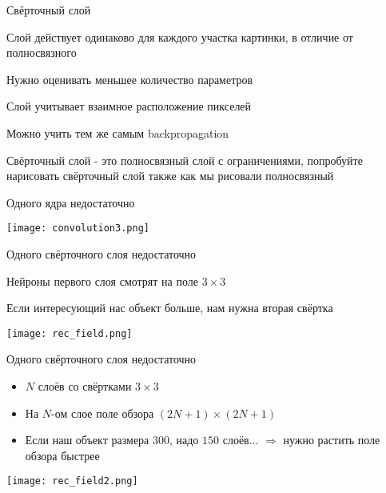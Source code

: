 \documentclass[notes,12pt, aspectratio=169]{beamer}
\newenvironment{wideitemize}{\itemize\addtolength{\itemsep}{10pt}}{\enditemize}
\begin{document}
\begin{frame}{Свёрточный слой}
\begin{wideitemize}
	\item  Слой действует одинаково для каждого участка картинки, в отличие от полносвязного 
	\item  Нужно оценивать меньшее количество параметров
	\item  Слой учитывает взаимное расположение пикселей
	\item  Можно учить тем же самым backpropagation 
	\item  Свёрточный слой -  это полносвязный слой с ограничениями, \alert{попробуйте нарисовать свёрточный слой также как мы рисовали полносвязный} 
\end{wideitemize}
\end{frame}


\begin{frame}{Одного ядра недостаточно}
\begin{center}
	\texttt{[image: convolution3.png]}
\end{center}
\end{frame}


\begin{frame}{Одного свёрточного слоя недостаточно}
\begin{wideitemize}
	\item  Нейроны первого слоя смотрят на поле $3 \times 3$ 
	\item  Если интересующий нас объект больше, нам нужна вторая свёртка 
\end{wideitemize}

\begin{center}
	\texttt{[image: rec\_field.png]}
\end{center}
\end{frame}


\begin{frame}{Одного свёрточного слоя недостаточно}
\begin{itemize}
	\item  $N$ слоёв со свёртками $3 \times 3$ 
	\item  На $N$-ом слое поле обзора  $(2N + 1) \times (2N + 1)$
	\item  Если наш объект размера $300$, надо $150$ слоёв...  \alert{$\Rightarrow$ нужно растить поле обзора быстрее}
\end{itemize}

\begin{center}
	\texttt{[image: rec\_field2.png]}
\end{center}
\end{frame}
\end{document}
